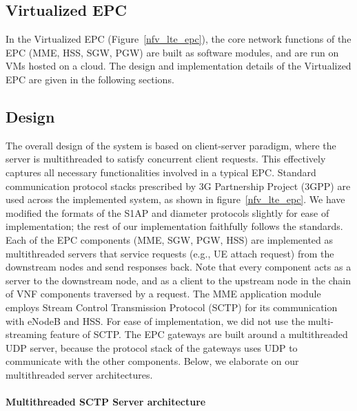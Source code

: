 \documentclass[hidelinks]{report}
\begin{document}
\subsection*{Virtualized EPC}

In the Virtualized EPC (Figure~\ref{nfv_lte_epc}), the core network functions of the EPC (MME, HSS, SGW, PGW) are built as software modules, and are run on VMs hosted on a cloud. The design and implementation details of the Virtualized EPC are given in the following sections.

\subsection*{Design}

The overall design of the system is based on client-server paradigm, where the server is multithreaded to satisfy concurrent client requests. This effectively captures all necessary functionalities involved in a typical EPC. Standard communication protocol stacks prescribed by 3G Partnership Project (3GPP) are used across the implemented system, as shown in figure~\ref{nfv_lte_epc}. We have modified the formats of the S1AP and diameter protocols slightly for ease of implementation; the rest of our implementation faithfully follows the standards. Each of the EPC components (MME, SGW, PGW, HSS) are implemented as multithreaded servers that service requests (e.g., UE attach request) from the downstream nodes and send responses back. Note that every component acts as a server to the downstream node, and as a client to the upstream node in the chain of VNF components traversed by a request. The MME application module employs Stream Control Transmission Protocol (SCTP) for its communication with eNodeB and HSS. For ease of implementation, we did not use the multi-streaming feature of SCTP. The EPC gateways are built around a multithreaded UDP server, because the protocol stack of the gateways uses UDP to communicate with the other components. Below, we elaborate on our multithreaded server architectures.

\paragraph*{Multithreaded SCTP Server architecture}
\end{document}
